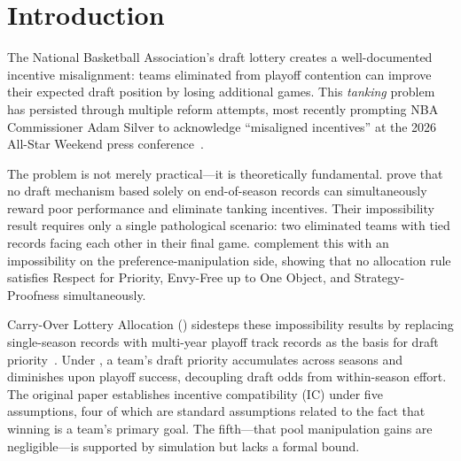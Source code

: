 \section{Introduction}
\label{sec:introduction}

%

The National Basketball Association's draft lottery creates a well-documented incentive misalignment: teams eliminated from playoff contention can improve their expected draft position by losing additional games. This \emph{tanking} problem has persisted through multiple reform attempts, most recently prompting NBA Commissioner Adam Silver to acknowledge ``misaligned incentives'' at the 2026 All-Star Weekend press conference~\citep{silver2026allstar}.

The problem is not merely practical---it is theoretically fundamental. \citet{munro2020notanking} prove that no draft mechanism based solely on end-of-season records can simultaneously reward poor performance and eliminate tanking incentives. Their impossibility result requires only a single pathological scenario: two eliminated teams with tied records facing each other in their final game. \citet{coreno2022axiomatic} complement this with an impossibility on the preference-manipulation side, showing that no allocation rule satisfies Respect for Priority, Envy-Free up to One Object, and Strategy-Proofness simultaneously.

Carry-Over Lottery Allocation (\cola{}) sidesteps these impossibility results by replacing single-season records with multi-year playoff track records as the basis for draft priority~\citep{highley2026cola}. Under \cola{}, a team's draft priority accumulates across seasons and diminishes upon playoff success, decoupling draft odds from within-season effort. The original paper establishes incentive compatibility (IC) under five assumptions, four of which are standard assumptions related to the fact that winning is a team's primary goal. The fifth---that pool manipulation gains are negligible---is supported by simulation but lacks a formal bound.

